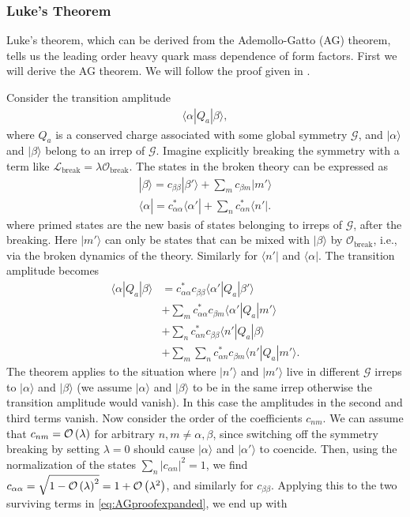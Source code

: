 \subsubsection{Luke's Theorem}
\label{sec:Luke}

Luke's theorem, which can be derived from the Ademollo-Gatto (AG) theorem, tells us the leading order heavy quark mass dependence of form factors. First we will derive the AG theorem. We will follow the proof given in \cite{Lebed:1991sq}.

Consider the transition amplitude
\begin{align}
  \langle \alpha | Q_a | \beta \rangle,
\end{align}
where $Q_a$ is a conserved charge associated with some global symmetry $\mathcal{G}$, and $|\alpha\rangle$ and $|\beta\rangle$ belong to an irrep of $\mathcal{G}$. Imagine explicitly breaking the symmetry with a term like $\mathscr{L}_{\text{break}} = \lambda \mathcal{O}_{\text{break}}$. The states in the broken theory can be expressed as
\begin{align}
  |\beta \rangle = c_{\beta\beta} | \beta' \rangle + \sum_{m} c_{\beta m} | m' \rangle \\
  \langle \alpha | = c^*_{\alpha\alpha} \langle \alpha' | + \sum_{n} c^*_{\alpha n} \langle n' |.
\end{align}
where primed states are the new basis of states belonging to irreps of $\mathcal{G}$, after the breaking. Here $|m'\rangle$ can only be states that can be mixed with $| \beta \rangle$ by $\mathcal{O}_{\text{break}}$, i.e., via the broken dynamics of the theory. Similarly for $\langle n' |$ and $\langle \alpha |$. The transition amplitude becomes
\begin{align}
  \nonumber
  \langle \alpha | Q_a | \beta \rangle
  &= c_{\alpha\alpha}^* c_{\beta\beta} \langle \alpha' | Q_a | \beta' \rangle \\
  \nonumber
  &+ \sum_m c_{\alpha\alpha}^* c_{\beta m} \langle \alpha' | Q_a | m' \rangle \\
  \nonumber
  &+ \sum_n c_{\alpha n}^* c_{\beta \beta} \langle n' | Q_a | \beta \rangle \\
  &+ \sum_m\sum_n c_{\alpha n}^* c_{\beta m} \langle n' | Q_a | m' \rangle.
  \label{eq:AGproofexpanded}
\end{align}
The theorem applies to the situation where $|n'\rangle$ and $|m'\rangle$ live in different $\mathcal{G}$ irreps to $|\alpha\rangle$ and $|\beta \rangle$ (we assume $|\alpha\rangle$ and $|\beta \rangle$ to be in the same irrep otherwise the transition amplitude would vanish). In this case the amplitudes in the second and third terms vanish. Now consider the order of the coefficients $c_{nm}$. We can assume that $c_{nm} = \mathcal{O}\left( \lambda \right)$ for arbitrary $n,m \neq \alpha,\beta$, since switching off the symmetry breaking by setting $\lambda=0$ should cause $|\alpha\rangle $ and $|\alpha'\rangle$ to coencide. Then, using the normalization of the states $\sum_{n} |c_{\alpha n} |^2 = 1$, we find $c_{\alpha\alpha} = \sqrt{1 - \mathcal{O}\left( \lambda \right)^2} = 1 + \mathcal{O}\left( \lambda^2 \right)$, and similarly for $c_{\beta\beta}$. Applying this to the two surviving terms in \eqref{eq:AGproofexpanded}, we end up with
